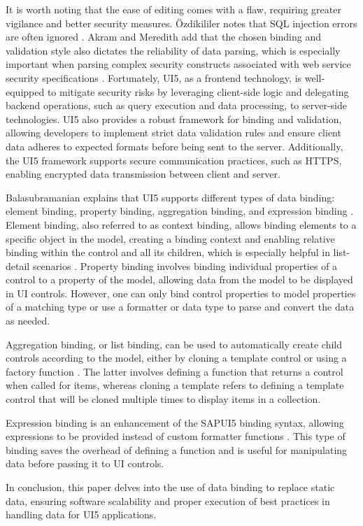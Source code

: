 \documentclass{article}
\begin{document}
It is worth noting that the ease of editing comes with a flaw, requiring greater vigilance and better security measures. Özdikililer notes that SQL injection errors are often ignored \parencite{Ozdikililer2021}. Akram and Meredith add that the chosen binding and validation style also dictates the reliability of data parsing, which is especially important when parsing complex security constructs associated with web service security specifications \parencite{Akram2007}. Fortunately, UI5, as a frontend technology, is well-equipped to mitigate security risks by leveraging client-side logic and delegating backend operations, such as query execution and data processing, to server-side technologies. UI5 also provides a robust framework for binding and validation, allowing developers to implement strict data validation rules and ensure client data adheres to expected formats before being sent to the server. Additionally, the UI5 framework supports secure communication practices, such as HTTPS, enabling encrypted data transmission between client and server.

Balasubramanian explains that UI5 supports different types of data binding: element binding, property binding, aggregation binding, and expression binding \parencite{Balasubramanian2023}. Element binding, also referred to as context binding, allows binding elements to a specific object in the model, creating a binding context and enabling relative binding within the control and all its children, which is especially helpful in list-detail scenarios \parencite{SAP2024b}. Property binding involves binding individual properties of a control to a property of the model, allowing data from the model to be displayed in UI controls. However, one can only bind control properties to model properties of a matching type or use a formatter or data type to parse and convert the data as needed.

Aggregation binding, or list binding, can be used to automatically create child controls according to the model, either by cloning a template control or using a factory function \parencite{SAP2024b}. The latter involves defining a function that returns a control when called for items, whereas cloning a template refers to defining a template control that will be cloned multiple times to display items in a collection.

Expression binding is an enhancement of the SAPUI5 binding syntax, allowing expressions to be provided instead of custom formatter functions \parencite{SAP2024b}. This type of binding saves the overhead of defining a function and is useful for manipulating data before passing it to UI controls.

In conclusion, this paper delves into the use of data binding to replace static data, ensuring software scalability and proper execution of best practices in handling data for UI5 applications.

\clearpage
\printbibliography[title={Works Cited}]
\end{document}
